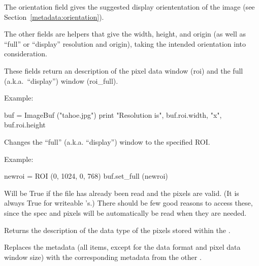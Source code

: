 The {\cf orientation} field gives the suggested display oriententation of
the image (see Section~\ref{metadata:orientation}).

The other fields are helpers that give the width, height, and origin
(as well as ``full'' or ``display'' resolution and origin), taking the
intended orientation into consideration.
\apiend

These fields return an \ROI description of the pixel data window
({\cf roi}) and the full (a.k.a.\ ``display'') window ({\cf roi_full}).

\noindent Example:
\begin{code}
    buf = ImageBuf ("tahoe.jpg")
    print "Resolution is", buf.roi.width, "x", buf.roi.height
\end{code}
\apiend

Changes the ``full'' (a.k.a. ``display'') window to the specified ROI.

\noindent Example:
\begin{code}
    newroi = ROI (0, 1024, 0, 768)
    buf.set_full (newroi)
\end{code}
\apiend

Will be {\cf True} if the file has already been read and the pixels are
valid. (It is always {\cf True} for writeable \ImageBuf's.)
There should be few good reasons to access these, since the spec and pixels
will be automatically be read when they are needed. 
\apiend

Returns the description of the data type of the pixels stored within the
\ImageBuf.
\apiend

Replaces the metadata (all \ImageSpec items, except for the data format
and pixel data window size) with the corresponding metadata from the
other \ImageBuf.
\apiend

